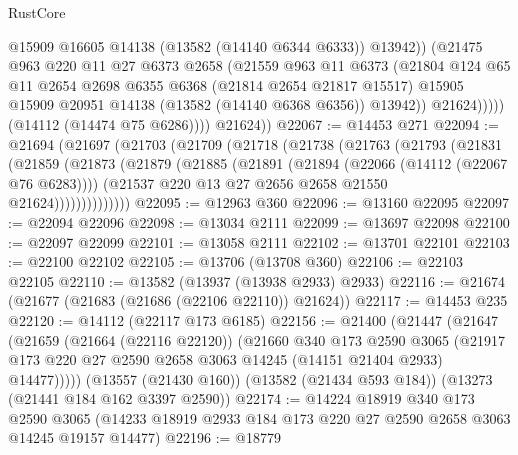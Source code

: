\begin{lexlean}{RustCore}
\begin{coremodule}
                        @15909
                        @16605
                        @14138
                        (@13582 (@14140 @6344 @6333))
                        @13942))
                    (@21475
                      @963
                      @220
                      @11
                      @27
                      @6373
                      @2658
                      (@21559
                        @963
                        @11
                        @6373
                        (@21804
                          @124
                          @65
                          @11
                          @2654
                          @2698
                          @6355
                          @6368
                          (@21814 @2654 @21817 @15517)
                          @15905
                          @15909
                          @20951
                          @14138
                          (@13582 (@14140 @6368 @6356))
                          @13942))
                      @21624)))))
            (@14112 (@14474 @75 @6286))))
        @21624))
@22067 := @14453 @271
@22094 := @21694
    (@21697
      (@21703
        (@21709
          (@21718
            (@21738
              (@21763
                (@21793
                  (@21831
                    (@21859
                      (@21873
                        (@21879
                          (@21885
                            (@21891
                              (@21894 (@22066 (@14112 (@22067 @76 @6283))))
                              (@21537 @220 @13 @27 @2656 @2658 @21550 @21624))))))))))))))
@22095 := @12963 @360
@22096 := @13160 @22095
@22097 := @22094 @22096
@22098 := @13034 @2111
@22099 := @13697 @22098
@22100 := @22097 @22099
@22101 := @13058 @2111
@22102 := @13701 @22101
@22103 := @22100 @22102
@22105 := @13706 (@13708 @360)
@22106 := @22103 @22105
@22110 := @13582 (@13937 (@13938 @2933) @2933)
@22116 := @21674 (@21677 (@21683 (@21686 (@22106 @22110)) @21624))
@22117 := @14453 @235
@22120 := @14112 (@22117 @173 @6185)
@22156 := @21400
    (@21447
      (@21647
        (@21659
          (@21664 (@22116 @22120))
          (@21660
            @340
            @173
            @2590
            @3065
            (@21917 @173 @220 @27 @2590 @2658 @3063 @14245 (@14151 @21404 @2933) @14477)))))
    (@13557 (@21430 @160))
    (@13582 (@21434 @593 @184))
    (@13273 (@21441 @184 @162 @3397 @2590))
@22174 := @14224
    @18919
    @340
    @173
    @2590
    @3065
    (@14233 @18919 @2933 @184 @173 @220 @27 @2590 @2658 @3063 @14245 @19157 @14477)
@22196 := @18779

\end{coremodule}
\end{lexlean}
